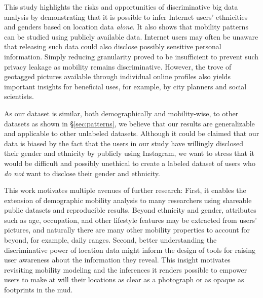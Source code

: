 This study highlights the risks and opportunities of discriminative big data analysis by demonstrating that it is possible to infer Internet users' ethnicities and genders based on location data \emph{alone}. It also shows that mobility patterns can be studied using publicly available data. Internet users may often be unaware that releasing such data could also disclose possibly sensitive personal information. Simply reducing granularity proved to be insufficient to prevent such privacy leakage as mobility remains discriminative. However, the trove of geotagged pictures available through individual online profiles also yields important insights for beneficial uses, for example, by city planners and social scientists. 

As our dataset is similar, both demographically and mobility-wise, to other datasets as shown in \S\ref{sec:patterns}, we believe that our results are generalizable and applicable to other unlabeled datasets. Although it could be claimed that our data is biased by the fact that the users in our study have willingly disclosed their gender and ethnicity by publicly using Instagram, we want to stress that it would be difficult and possibly unethical to create a labeled dataset of users who \emph{do not} want to disclose their gender and ethnicity.

This work motivates multiple avenues of further research: First, it enables the extension of demographic mobility analysis to many researchers using shareable public datasets and reproducible results. Beyond ethnicity and gender, attributes such as age, occupation, and other lifestyle features may be extracted from users' pictures, and naturally there are many other mobility properties to account for beyond, for example, daily ranges. Second, better understanding the discriminative power of location data might inform the design of tools for raising user awareness about the information they reveal. This insight motivates revisiting mobility modeling and the inferences it renders possible to empower users to make at will their locations as clear as a photograph or as opaque as footprints in the mud. 



